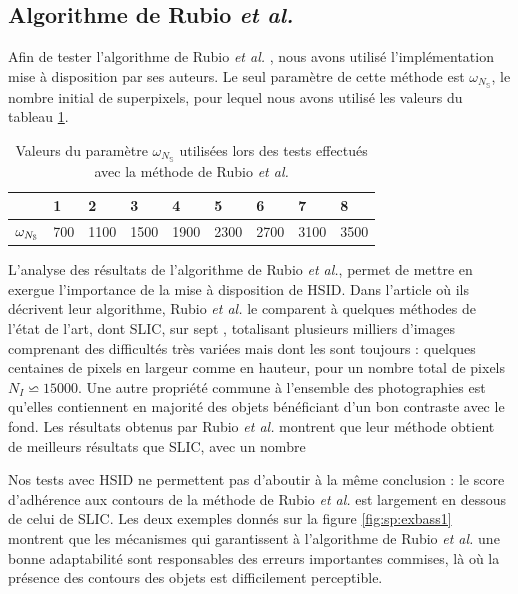   \subsection{Algorithme de Rubio \textit{et al.}}
Afin de tester l'algorithme de Rubio \textit{et al.} \cite{rubio2016bass}, nous avons utilisé l'implémentation mise à disposition par ses auteurs. Le seul paramètre de cette méthode est $\omega_{N_{\mathbb{S}}}$, le nombre initial de superpixels, pour lequel nous avons utilisé les valeurs du tableau \ref{tab:sp:BASSParam}.

\begin{table}[htb]
\caption{Valeurs du paramètre $\omega_{N_{\mathbb{S}}}$ utilisées lors des tests effectués avec la méthode de Rubio \textit{et al.}}
\centering
\begin{tabular}{|l|l|l|l|l|l|l|l|l|}
\hline
\cellcolor{gris}{\modif{Test} }& 1 & 2 & 3 &4 & 5&6 &7 &8 \\
\hline
$\cellcolor{gris}{\omega_{N_{\mathbb{S}}}}$&700&1100&1500&1900&2300&2700&3100&3500 \\
\hline
\end{tabular}
\label{tab:sp:BASSParam}
\end{table}

L'analyse des résultats de l'algorithme de Rubio \textit{et al.}, permet de mettre en exergue l'importance de la mise à disposition de HSID. Dans l'article \cite{rubio2016bass} où ils décrivent leur algorithme, Rubio \textit{et al.} le comparent à quelques méthodes de l'état de l'art, dont SLIC, sur sept  , totalisant plusieurs milliers d'images comprenant des difficultés très variées mais dont les  sont toujours  : quelques centaines de pixels en largeur comme en hauteur, pour un nombre total de pixels $N_{I} \backsimeq 15000$. Une autre propriété commune à l'ensemble des photographies est qu'elles contiennent en majorité des objets bénéficiant d'un bon contraste avec le fond. Les résultats obtenus par Rubio \textit{et al.} montrent que leur méthode obtient de meilleurs résultats que SLIC, avec un nombre  

Nos tests avec HSID ne permettent pas d'aboutir à la même conclusion :  le score d'adhérence aux contours de la méthode de Rubio \textit{et al.} est largement en dessous de celui de SLIC. Les deux exemples donnés sur la figure \ref{fig:sp:exbass1} montrent que les mécanismes qui garantissent à l'algorithme de Rubio \textit{et al.} une bonne adaptabilité sont responsables des erreurs importantes commises, là où la présence des contours des objets est difficilement perceptible.

